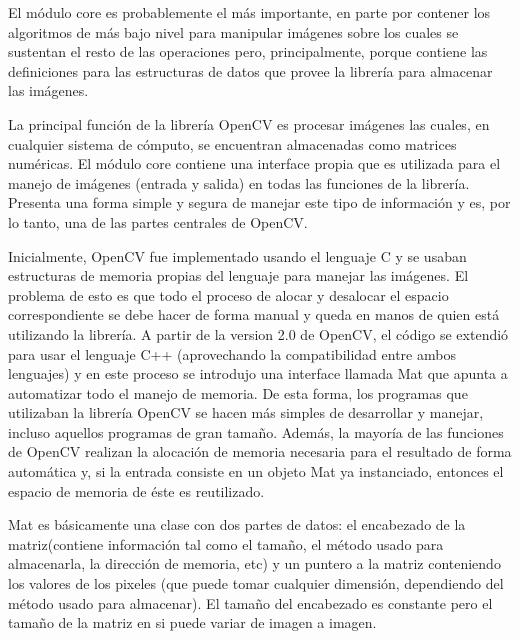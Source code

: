 \documentclass[a4paper,10pt]{report}
\begin{document}
% 
%  
% 




El módulo core es probablemente el más importante, en parte por contener los algoritmos de más bajo nivel para manipular imágenes sobre los cuales se sustentan el resto de las operaciones pero, principalmente, porque 
contiene las definiciones para las estructuras de datos que provee la librería para almacenar las imágenes.

La principal función de la librería OpenCV es procesar imágenes las cuales, en cualquier sistema de cómputo, se encuentran almacenadas como matrices numéricas. 
El módulo core contiene una interface propia que es utilizada para el manejo de imágenes (entrada y salida) en todas las funciones de la librería. 
Presenta una forma simple y segura de manejar este tipo de información y es, por lo tanto, una de las partes centrales de OpenCV.

Inicialmente, OpenCV fue implementado usando el lenguaje C y se usaban estructuras de memoria propias del lenguaje para manejar las imágenes. 
El problema de esto es que todo el proceso de alocar y desalocar el espacio correspondiente se debe hacer de forma manual y queda en manos de quien está utilizando la librería. 
A partir de la version 2.0 de OpenCV, el código se extendió para usar el lenguaje C++ (aprovechando la compatibilidad entre ambos lenguajes) y en este proceso se introdujo una interface llamada Mat que apunta a automatizar todo el manejo de memoria. 
De esta forma, los programas que utilizaban la librería OpenCV se hacen más simples de desarrollar y manejar, incluso aquellos programas de gran tamaño.
Además, la mayoría de las funciones de OpenCV realizan la alocación de memoria necesaria para el resultado de forma automática y, si la entrada consiste en un objeto Mat ya instanciado, entonces el espacio de memoria de éste es reutilizado.

Mat es básicamente una clase con dos partes de datos: el encabezado de la matriz(contiene información tal como el tamaño, el método usado para almacenarla, la dirección de memoria, etc) y un puntero a la matriz conteniendo los valores de los pixeles (que puede tomar cualquier dimensión, dependiendo del método usado para almacenar).
El tamaño del encabezado es constante pero el tamaño de la matriz en si puede variar de imagen a imagen.
\end{document}
